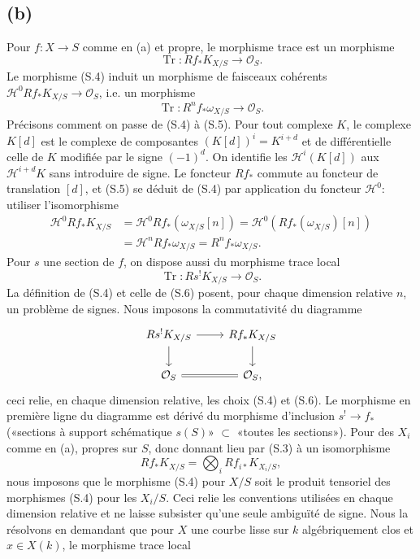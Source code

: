 \documentclass[11pt]{article}
\DeclareMathOperator{\Tr}{Tr}
\newcommand{\OO}{\mathcal O}
\begin{document}
\subsection*{(b)}
Pour $f:X\to S$ comme en (a) et propre, le morphisme trace est un morphisme
\begin{equation}
        \Tr:Rf_*K_{X/S}\longrightarrow\OO_S. \tag{S.4}
\end{equation}
Le morphisme (S.4) induit un morphisme de faisceaux cohérents $\mathcal H^0Rf_*K_{X/S}\to\OO_S$, i.e. un morphisme
\begin{equation}
        \Tr:R^nf_*\omega_{X/S}\longrightarrow\OO_S. \tag{S.5}
\end{equation}
Précisons comment on passe de (S.4) à (S.5). Pour tout complexe $K$, le complexe $K[d]$ est le complexe de composantes $(K[d])^i=K^{i+d}$ et de différentielle celle de $K$ modifiée par le signe $(-1)^d$. On identifie les $\mathcal H^i(K[d])$ aux $\mathcal H^{i+d}K$ sans introduire de signe. Le foncteur $Rf_*$ commute au foncteur de translation $[d]$, et (S.5) se déduit de (S.4) par application du foncteur $\mathcal H^0$: utiliser l'isomorphisme
\[
\begin{split}
\mathcal H^0 Rf_*K_{X/S}
&=\mathcal H^0 Rf_*(\omega_{X/S}[n])
=\mathcal H^0(Rf_*(\omega_{X/S})[n]) \\
&=\mathcal H^n Rf_*\omega_{X/S}=R^nf_*\omega_{X/S}.
\end{split}
\]
Pour $s$ une section de $f$, on dispose aussi du morphisme trace local
\begin{equation}
        \Tr:Rs^!K_{X/S}\longrightarrow\OO_S. \tag{S.6}
\end{equation}
La définition de (S.4) et celle de (S.6) posent, pour chaque dimension relative $n$, un problème de signes. Nous imposons la commutativité du diagramme
\[
\begin{tikzcd}
Rs^!K_{X/S} \arrow[r] \arrow[d] & Rf_*K_{X/S} \arrow[d] \\
\OO_S \arrow[r,equal] & \OO_S,
\end{tikzcd}
\]
ceci relie, en chaque dimension relative, les choix (S.4) et (S.6). Le morphisme en première ligne du diagramme est dérivé du morphisme d'inclusion $s^!\to f_*$ («sections à support schématique $s(S)$» $\subset$ «toutes les sections»). Pour des $X_i$ comme en (a), propres sur $S$, donc donnant lieu par (S.3) à un isomorphisme
\[
        Rf_*K_{X/S}=\bigotimes_iRf_{i*}K_{X_i/S},
\]
nous imposons que le morphisme (S.4) pour $X/S$ soit le produit tensoriel des morphismes (S.4) pour les $X_i/S$. Ceci relie les conventions utilisées en chaque dimension relative et ne laisse subsister qu'une seule ambiguïté de signe. Nous la résolvons en demandant que pour $X$ une courbe lisse sur $k$ algébriquement clos et $x\in X(k)$, le morphisme trace local
\end{document}
